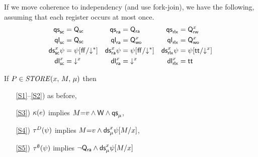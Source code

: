 If we move coherence to independency (and use fork-join), we have the
following, assuming that each register occurs at most once.
\begin{align*}
  \mathsf{qs}_{{\mathsf{sc}}}^{}&=\mathsf{Q}_{{\mathsf{sc}}}
  &\mathsf{qs}_{{\mathsf{ra}}}^{}&=\mathsf{Q}_{{\mathsf{ra}}}
  &\mathsf{qs}_{{\mathsf{rlx}}}^{}&=\mathsf{Q}_{\mathsf{rw}}^{x}
  \\
  \mathsf{ql}_{{\mathsf{sc}}}^{}&=\mathsf{Q}_{{\mathsf{sc}}}
  &\mathsf{ql}_{{\mathsf{ra}}}^{}&=\mathsf{Q}_{\mathsf{wo}}^{x}
  &\mathsf{ql}_{{\mathsf{rlx}}}^{}&=\mathsf{Q}_{\mathsf{wo}}^{x}
  \\
  \mathsf{ds}_{{\mathsf{sc}}}^{x}\psi&=\psi[\mkern.6mu\mathsf{ff}\mkern.6mu/\mathord{\downarrow^{\mathtt{*}}}]
  &\mathsf{ds}_{{\mathsf{ra}}}^{x}\psi&=\psi[\mkern.6mu\mathsf{ff}\mkern.6mu/\mathord{\downarrow^{\mathtt{*}}}]
  &\mathsf{ds}_{{\mathsf{rlx}}}^{x}\psi&=\psi[\mathsf{tt}/\mathord{\downarrow^{x}}] 
  \\
  \mathsf{dl}_{{\mathsf{sc}}}^{x}&=\mathord{\downarrow^{x}}
  &\mathsf{dl}_{{\mathsf{ra}}}^{x}&=\mathord{\downarrow^{x}}
  &\mathsf{dl}_{{\mathsf{rlx}}}^{x}&=\mathsf{tt}
\end{align*}







  \noindent
  If $\aPS \in \sSTORE[\amode]{\aLoc}{\aExp}$ then
  \begin{enumerate}
  \item[\ref{S1}--\ref{S2})] as before,
  \item[\ref{S3})]
    $\kappa(e)$ implies
    \begin{math}
      M{=}v
      \land \mathsf{W}
      \land \mathsf{qs}_{\mu}^{}
    \end{math},
  \item[\ref{S4})]
    $\aTr{\bEvs}{\bForm}$ implies 
    \begin{math}
      M{=}v
      \land \mathsf{ds}_{\mu}^{x}\psi[M/{x}]
    \end{math},
  \item[\ref{S5})]
    $\aTr{\emptyset}{\bForm}$ implies 
    \begin{math}
      \lnot\mathsf{Q}_{{\mathsf{ra}}}
      \land \mathsf{ds}_{\mu}^{x}\psi[M/{x}]
    \end{math}
  \end{enumerate}

